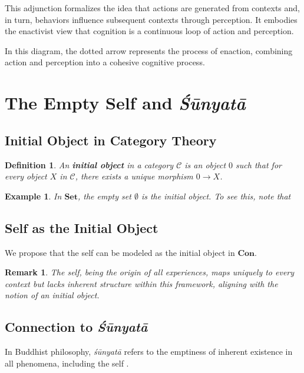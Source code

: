 \documentclass{article}
\newtheorem{definition}{Definition}[section]
\newtheorem{remark}{Remark}[section]
\newtheorem{example}{Example}[section]
\begin{document}
This adjunction formalizes the idea that actions are generated from contexts and, in turn, behaviors influence subsequent contexts through perception. It embodies the enactivist view that cognition is a continuous loop of action and perception.

In this diagram, the dotted arrow represents the process of enaction, combining action and perception into a cohesive cognitive process.

\section{The Empty Self and \emph{Śūnyatā}}

\subsection{Initial Object in Category Theory}

\begin{definition} An \textbf{initial object} in a category $\mathcal{C}$ is an object $0$ such that for every object $X$ in $\mathcal{C}$, there exists a unique morphism $0 \to X$. \end{definition}

\begin{example} In $\mathbf{Set}$, the empty set $\emptyset$ is the initial object. To see this, note that \end{example}

\subsection{Self as the Initial Object}

We propose that the self can be modeled as the initial object in $\mathbf{Con}$.

\begin{remark} The self, being the origin of all experiences, maps uniquely to every context but lacks inherent structure within this framework, aligning with the notion of an initial object. \end{remark}

\subsection{Connection to \emph{Śūnyatā}}

In Buddhist philosophy, \emph{śūnyatā} refers to the emptiness of inherent existence in all phenomena, including the self \cite{garfield1995}.
\end{document}
